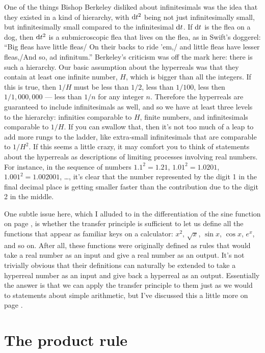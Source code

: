 One of the things Bishop Berkeley disliked about infinitesimals was the idea that
they existed in a kind of hierarchy, with $\textup{d} t^2$ being not just infinitesimally small, but infinitesimally
small compared to the infinitesimal $\textup{d} t$.
If $\textup{d} t$ is the flea on a dog, then $\textup{d} t^2$ is a submicroscopic
flea that lives on the flea, as in Swift's doggerel: ``Big fleas have little fleas/ On their backs to ride 'em,/
and little fleas have lesser fleas,/And so, ad infinitum.'' Berkeley's criticism was off the mark here: there is
such a hierarchy. Our basic assumption about the hyperreals was that they contain at least one infinite number,
$H$, which is bigger than all the integers. If this is true, then $1/H$ must be less than $1/2$, less than
$1/100$, less then $1/1,000,000$ --- less than $1/n$ for any integer $n$. Therefore the hyperreals are guaranteed
to include infinitesimals as well, and so we have at least three levels to the hierarchy: infinities comparable
to $H$, finite numbers, and infinitesimals comparable to $1/H$. If you can swallow that, then it's not too much
of a leap to add more rungs to the ladder, like extra-small infinitesimals that are comparable to $1/H^2$.
If this seems a little crazy, it may comfort you to think of statements about the hyperreals as descriptions
of limiting processes involving real numbers. For instance, in the sequence of numbers $1.1^2=1.21$,
$1.01^2=1.0201$, $1.001^2=1.002001$, \ldots, it's clear that the number represented by the digit 1 in the final decimal place is getting
smaller faster than the contribution due to the digit 2 in the middle.

\label{transcendentals}
One subtle issue here, which I alluded to in the differentiation of the sine function on page \pageref{eg:derivative-of-sin},
is whether the transfer principle is sufficient to let us define all the functions that
appear as familiar keys on a calculator: $x^2$, $\sqrt{x}$, $\sin x$, $\cos x$, $e^x$, and so on.
After all, these functions were originally defined as rules that would take a real number as an input
and give a real number as an output. It's not trivially obvious that their definitions can naturally be extended
to take a hyperreal number as an input and give back a hyperreal as an output. Essentially the answer is that
we can apply the transfer principle to them just as we would to statements about simple arithmetic, but I've discussed
this a little more on page \pageref{detour:transcendentals}.

\section{The product rule}

